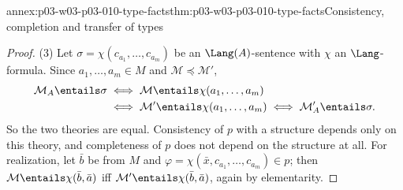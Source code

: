 \begin{annexitem}{annex:p03-w03-p03-010-type-facts}{thm:p03-w03-p03-010-type-facts}{Consistency, completion and transfer of types}
\begin{proof}
(3) Let \(\sigma=\chi(c_{a_1},\ldots,c_{a_m})\) be an
\(\Lang(A)\)-sentence with \(\chi\) an \(\Lang\)-formula.  Since
\(a_1,\ldots,a_m\in M\) and \(\mathcal M\preccurlyeq\mathcal M'\),
\begin{align*}
  \mathcal M_A\entails\sigma
  &\iff\mathcal M\entails\chi(a_1,\ldots,a_m)\\
  &\iff\mathcal M'\entails\chi(a_1,\ldots,a_m)
  \iff\mathcal M'_A\entails\sigma .
\end{align*}
So the two theories are equal.  Consistency of \(p\) with a structure
depends only on this theory, and completeness of \(p\) does not depend on
the structure at all.  For realization, let \(\bar b\) be from \(M\) and
\(\varphi=\chi(\bar x,c_{a_1},\ldots,c_{a_m})\in p\); then
\(\mathcal M\entails\chi(\bar b,\bar a)\) iff
\(\mathcal M'\entails\chi(\bar b,\bar a)\), again by elementarity.
\end{proof}
\end{annexitem}


